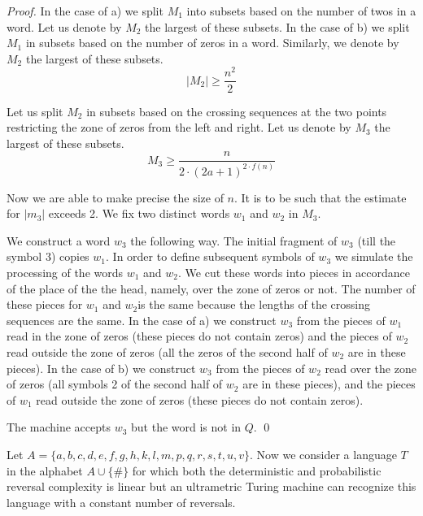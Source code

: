 \documentclass{llncs}
\begin{document}
\begin{proof}
In the case of a) we split $M_1$ into subsets based on the number of twos in a word. Let us denote by $M_2$ the largest of these subsets. In the case of b) we split $M_1$ in subsets based on the number of zeros in a word. Similarly, we denote by $M_2$ the largest of these subsets. $$|M_2|\geq \frac{n^2}{2}$$

Let us split $M_2$ in subsets based on the crossing sequences at the two points restricting the zone of zeros from the left and right. Let us denote by $M_3$ the largest of these subsets. $$M_3 \geq \frac{n}{2\cdot (2a+1)^{2\cdot f(n)}}$$

Now we are able to make precise the size of $n$. It is to be such that the estimate for $|m_3|$ exceeds 2. We fix two distinct words $w_1$ and $w_2$ in $M_3$.

We construct a word $w_3$ the following way. The initial fragment of $w_3$ (till the symbol 3) copies $w_1$. In order to define subsequent symbols of $w_3$ we simulate the processing of the words $w_1$ and $w_2$. We cut these words into pieces in accordance of the place of the the head, namely, over the zone of zeros or not. The number of these pieces for $w_1$ and $w_2$is the same because the lengths of the crossing sequences are the same. In the case of a) we construct $w_3$ from the pieces of $w_1$ read in the zone of zeros (these pieces do not contain zeros) and the pieces of $w_2$ read outside   the zone of zeros (all the zeros of the second half of $w_2$ are in these pieces). In the case of b) we construct $w_3$ from the pieces of $w_2$ read over the zone of zeros (all symbols 2 of the second half of $w_2$ are in these pieces), and the pieces of $w_1$ read outside the zone of zeros (these pieces do not contain zeros). 

The machine accepts $w_3$ but the word is not in $Q$. 
\qed

\end{proof}

\bigskip










Let $A = \{a,b,c,d,e,f,g,h,k,l,m,p,q,r,s,t,u,v\}$.
Now we consider a language $T$ in the alphabet $A \cup \{\#\} $ for which both the deterministic and probabilistic reversal complexity is linear but an ultrametric Turing machine can recognize this language with a constant number of reversals.
\end{document}
